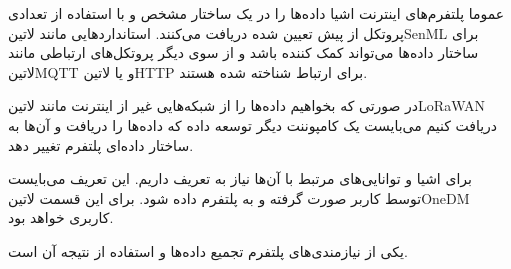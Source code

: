 \documentclass[]{report}
\begin{document}

عموما پلتفرم‌های اینترنت اشیا داده‌ها را در یک ساختار مشخص
و با استفاده از تعدادی پروتکل از پیش تعیین شده دریافت می‌کنند.
استانداردهایی مانند ‌لاتین{SenML} برای ساختار داده‌ها می‌تواند
کمک کننده باشد و از سوی دیگر پروتکل‌های ارتباطی مانند ‌لاتین{MQTT}
و یا ‌لاتین{HTTP} برای ارتباط شناخته شده هستند.

در صورتی که بخواهیم داده‌ها را از شبکه‌هایی غیر از اینترنت مانند ‌لاتین{LoRaWAN}
دریافت کنیم می‌بایست یک کامپوننت دیگر توسعه داده که داده‌ها را دریافت و آن‌ها به ساختار
داده‌ای پلتفرم تغییر دهد.


برای اشیا و توانایی‌های مرتبط با آن‌ها نیاز به تعریف داریم. این تعریف می‌بایست توسط کاربر صورت
گرفته و به پلتفرم داده شود. برای این قسمت ‌لاتین{OneDM} کاربری خواهد بود.


یکی از نیازمندی‌های پلتفرم تجمیع داده‌ها و استفاده از نتیجه آن است.
\end{document}
